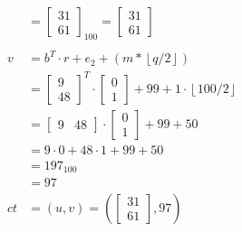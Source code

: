 \begin{align*}
          & = \begin{bmatrix}
                31 \\ 
                61 
              \end{bmatrix}_{100}
  = 
  \begin{bmatrix}
    31 \\
    61
  \end{bmatrix}                                                    \\
  \\
  v       & = b^T \cdot r + e_2 + (m*\left\lfloor q/2\right\rfloor) \\
          & =\begin{bmatrix}
               9 \\
               48
             \end{bmatrix}^T
  \cdot
  \begin{bmatrix}
    0 \\
    1
  \end{bmatrix}
  + 99 + 1 \cdot \left\lfloor 100/2\right\rfloor                    \\
          & =\begin{bmatrix}
               9 & 48
             \end{bmatrix}
  \cdot
  \begin{bmatrix}
    0 \\ 
    1 
  \end{bmatrix}
  + 99 + 50                                                         \\
          & = 9 \cdot 0 +48 \cdot 1 + 99 + 50                       \\
          & = 197_{100}                                             \\
          & = 97                                                    \\
  ct & = (u, v) = \left (
  \begin{bmatrix}
      31 \\
      61
    \end{bmatrix}, 97   \right )                                      \\
\end{align*}

